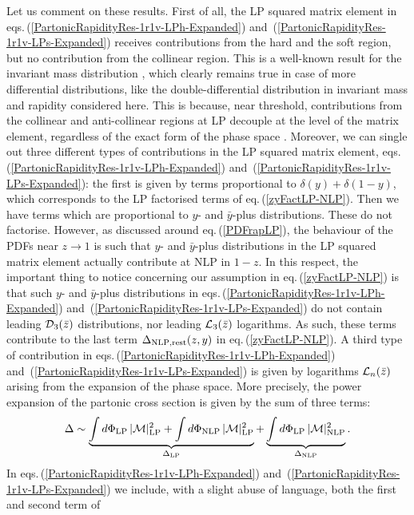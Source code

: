 \documentclass[11pt]{article}
\newcommand{\be}{\begin{equation}}
\newcommand{\ee}{\end{equation}}
\newcommand\eqn[1]     {eq.\,(\ref{#1})}
\newcommand\eqns[2]    {eqs.\,(\ref{#1}) and~(\ref{#2})}
\begin{document}
Let us comment on these results. 
First of all, the LP squared matrix element in
\eqns{PartonicRapidityRes-1r1v-LPh-Expanded}{PartonicRapidityRes-1r1v-LPs-Expanded} 
receives contributions from the hard and 
the soft region, but no contribution from 
the collinear region. This is a well-known 
result for the invariant mass distribution 
\cite{Bonocore:2014wua}, which clearly 
remains true in case of more differential 
distributions, like the double-differential
distribution in invariant mass and rapidity 
considered here. This is because, near 
threshold, contributions from the collinear 
and anti-collinear regions at LP decouple 
at the level of the matrix element, 
regardless of the exact form of the 
phase space \cite{Collins:1981uw,Collins:1985ue,Collins:1988ig,Bauer:2001yt}.
Moreover, we can single out three different 
types of contributions in the LP squared matrix element, 
\eqns{PartonicRapidityRes-1r1v-LPh-Expanded}{PartonicRapidityRes-1r1v-LPs-Expanded}: 
the first is given by terms proportional 
to $\delta(y) + \delta(1 - y)$, which 
corresponds to the LP factorised 
terms of \eqn{zyFactLP-NLP}. Then we 
have terms which are proportional to
$y$- and $\bar y$-plus distributions.
These do not factorise. However, as 
discussed around \eqn{PDFrapLP}, the 
behaviour of the PDFs near $z \to 1$
is such that $y$- and $\bar y$-plus 
distributions in the LP squared matrix element 
actually contribute at NLP in $1-z$. In 
this respect, the important thing to 
notice concerning our assumption in 
\eqn{zyFactLP-NLP} is that such $y$- and 
$\bar y$-plus distributions in 
\eqns{PartonicRapidityRes-1r1v-LPh-Expanded}{PartonicRapidityRes-1r1v-LPs-Expanded}
do not contain leading ${\cal D}_3(\bar z)$
distributions, nor leading ${\cal L}_3(\bar z)$
logarithms. As such, these terms 
contribute to the last term $\Delta_{\rm NLP,rest}(z,y)$
in \eqn{zyFactLP-NLP}. A third type 
of contribution in 
\eqns{PartonicRapidityRes-1r1v-LPh-Expanded}{PartonicRapidityRes-1r1v-LPs-Expanded}
is given by logarithms ${\cal L}_n(\bar z)$
arising from the expansion of the phase space.
More precisely, the power expansion of the 
partonic cross section is given by the sum 
of three terms:
\be\label{powerExpansion+PS}
\Delta \sim \underbrace{\int d\Phi_{\rm LP} \,|\mathcal{M}|_{\rm LP}^2
+ \int d\Phi_{\rm NLP} \,|\mathcal{M}|_{\rm LP}^2}_{\Delta_{\rm LP}} 
+ \underbrace{\int d\Phi_{\rm LP} 
\,|\mathcal{M}|_{\rm NLP}^2}_{\Delta_{\rm NLP}}.
\ee
In \eqns{PartonicRapidityRes-1r1v-LPh-Expanded}{PartonicRapidityRes-1r1v-LPs-Expanded} 
we include, with a slight abuse of language, 
both the first and second term of 
\end{document}
